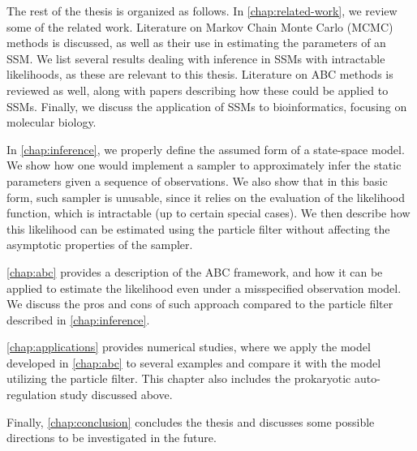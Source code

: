 The rest of the thesis is organized as follows. In \autoref{chap:related-work}, we review some of the related work. Literature on Markov Chain Monte Carlo (MCMC) methods is discussed, as well as their use in estimating the parameters of an SSM. We list several results dealing with inference in SSMs with intractable likelihoods, as these are relevant to this thesis. Literature on ABC methods is reviewed as well, along with papers describing how these could be applied to SSMs. Finally, we discuss the application of SSMs to bioinformatics, focusing on molecular biology.

In \autoref{chap:inference}, we properly define the assumed form of a state-space model. We show how one would implement a sampler to approximately infer the static parameters given a sequence of observations. We also show that in this basic form, such sampler is unusable, since it relies on the evaluation of the likelihood function, which is intractable (up to certain special cases). We then describe how this likelihood can be estimated using the particle filter \citep{particle-filter} without affecting the asymptotic properties of the sampler.

\autoref{chap:abc} provides a description of the ABC framework, and how it can be applied to estimate the likelihood even under a misspecified observation model. We discuss the pros and cons of such approach compared to the particle filter described in \autoref{chap:inference}.

\autoref{chap:applications} provides numerical studies, where we apply the model developed in \autoref{chap:abc} to several examples and compare it with the model utilizing the particle filter. This chapter also includes the prokaryotic auto-regulation study discussed above.

Finally, \autoref{chap:conclusion} concludes the thesis and discusses some possible directions to be investigated in the future.
